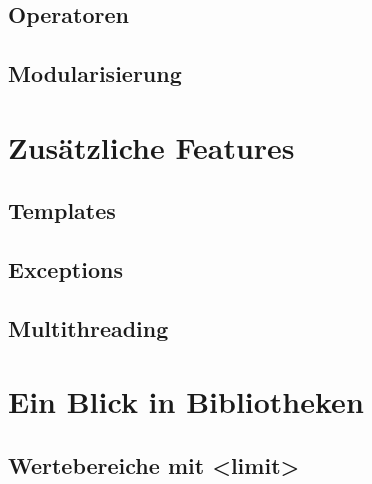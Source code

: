 \documentclass[a4paper]{report}
\begin{document}
\section{Operatoren}




\section{Modularisierung}

\chapter{Zusätzliche Features}
\section{Templates}
\section{Exceptions}
\section{Multithreading}

\chapter{Ein Blick in Bibliotheken}

\section{Wertebereiche mit <limit>}

	
\end{document}
